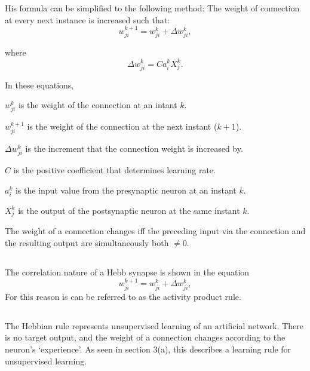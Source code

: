 \documentclass[a4paper]{report}
\begin{document}
His formula can be simplified to the following method: The weight of connection at every next instance is increased such that:
\[w_{ji}^{k+1} = w_{ji}^k + \Delta w_{ji}^k,\]

where \[\Delta w_{ji}^k = Ca_i^kX_j^k.\]

In these equations,

\(w_{ji}^k\) is the weight of the connection at an intant \(k\).

\(w_{ji}^{k+1}\) is the weight of the connection at the next instant (\(k+1\)).

\(\Delta w_{ji}^k\) is the increment that the connection weight is increased by.

\(C\) is the positive coefficient that determines learning rate.

\(a_i^k\) is the input value from the presynaptic neuron at an instant \(k\).

\(X_j^k\) is the output of the postsynaptic neuron at the same instant \(k\).
\linebreak

The weight of a connection changes iff the preceding input via the connection and the resulting output are simultaneously both \(\neq 0\).
\subsection{}
The correlation nature of a Hebb synapse is shown in the equation \[w_{ji}^{k+1} = w_{ji}^k + \Delta w_{ji}^k,\] For this reason is can be referred to as the activity product rule.

\subsection{}
The Hebbian rule represents unsupervised learning of an artificial network. There is no target output, and the weight of a connection changes according to the neuron's `experience'. As seen in section 3(a), this describes a learning rule for unsupervised learning.
\end{document}
